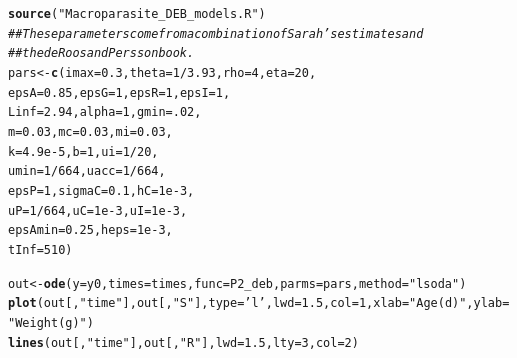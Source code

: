 \documentclass[12pt,reqno,final,pdftex]{amsart}\usepackage[]{graphicx}\usepackage[]{color}
\makeatletter
\newcommand{\hlnum}[1]{\textcolor[rgb]{0.686,0.059,0.569}{#1}}%
\newcommand{\hlstr}[1]{\textcolor[rgb]{0.192,0.494,0.8}{#1}}%
\newcommand{\hlcom}[1]{\textcolor[rgb]{0.678,0.584,0.686}{\textit{#1}}}%
\newcommand{\hlopt}[1]{\textcolor[rgb]{0,0,0}{#1}}%
\newcommand{\hlstd}[1]{\textcolor[rgb]{0.345,0.345,0.345}{#1}}%
\newcommand{\hlkwb}[1]{\textcolor[rgb]{0.69,0.353,0.396}{#1}}%
\newcommand{\hlkwc}[1]{\textcolor[rgb]{0.333,0.667,0.333}{#1}}%
\newcommand{\hlkwd}[1]{\textcolor[rgb]{0.737,0.353,0.396}{\textbf{#1}}}%
\newenvironment{kframe}{%
 \def\at@end@of@kframe{}%
 \ifinner\ifhmode%
  \def\at@end@of@kframe{\end{minipage}}%
  \begin{minipage}{\columnwidth}%
 \fi\fi%
 \def\FrameCommand##1{\hskip\@totalleftmargin \hskip-\fboxsep
 \colorbox{shadecolor}{##1}\hskip-\fboxsep
     \hskip-\linewidth \hskip-\@totalleftmargin \hskip\columnwidth}%
 \MakeFramed {\advance\hsize-\width
   \@totalleftmargin\z@ \linewidth\hsize
   \@setminipage}}%
 {\par\unskip\endMakeFramed%
 \at@end@of@kframe}
\newenvironment{knitrout}{}{} %
\theoremstyle{plain}
\numberwithin{equation}{part}
\makeatother
\begin{document}
\begin{knitrout}
\begin{kframe}
\begin{alltt}
\hlkwd{source}\hlstd{(}\hlstr{"Macroparasite_DEB_models.R"}\hlstd{)}
\hlcom{## These parameters come from a combination of Sarah's estimates and}
\hlcom{## the de Roos and Persson book.}
\hlstd{pars} \hlkwb{<-} \hlkwd{c}\hlstd{(}\hlkwc{imax}\hlstd{=}\hlnum{0.3}\hlstd{,} \hlkwc{theta}\hlstd{=}\hlnum{1}\hlopt{/}\hlnum{3.93}\hlstd{,} \hlkwc{rho}\hlstd{=}\hlnum{4}\hlstd{,} \hlkwc{eta}\hlstd{=}\hlnum{20}\hlstd{,}
          \hlkwc{epsA}\hlstd{=}\hlnum{0.85}\hlstd{,} \hlkwc{epsG}\hlstd{=}\hlnum{1}\hlstd{,} \hlkwc{epsR}\hlstd{=}\hlnum{1}\hlstd{,} \hlkwc{epsI}\hlstd{=}\hlnum{1}\hlstd{,}
          \hlkwc{Linf}\hlstd{=}\hlnum{2.94}\hlstd{,} \hlkwc{alpha}\hlstd{=}\hlnum{1}\hlstd{,} \hlkwc{gmin}\hlstd{=}\hlnum{.02}\hlstd{,}
          \hlkwc{m}\hlstd{=}\hlnum{0.03}\hlstd{,} \hlkwc{mc}\hlstd{=}\hlnum{0.03}\hlstd{,} \hlkwc{mi}\hlstd{=}\hlnum{0.03}\hlstd{,}
          \hlkwc{k}\hlstd{=}\hlnum{4.9e-5}\hlstd{,} \hlkwc{b}\hlstd{=}\hlnum{1}\hlstd{,} \hlkwc{ui}\hlstd{=}\hlnum{1}\hlopt{/}\hlnum{20}\hlstd{,}
          \hlkwc{umin}\hlstd{=}\hlnum{1}\hlopt{/}\hlnum{664}\hlstd{,} \hlkwc{uacc}\hlstd{=}\hlnum{1}\hlopt{/}\hlnum{664}\hlstd{,}
          \hlkwc{epsP}\hlstd{=}\hlnum{1}\hlstd{,} \hlkwc{sigmaC}\hlstd{=}\hlnum{0.1}\hlstd{,} \hlkwc{hC}\hlstd{=}\hlnum{1e-3}\hlstd{,}
          \hlkwc{uP}\hlstd{=}\hlnum{1}\hlopt{/}\hlnum{664}\hlstd{,} \hlkwc{uC}\hlstd{=}\hlnum{1e-3}\hlstd{,} \hlkwc{uI}\hlstd{=}\hlnum{1e-3}\hlstd{,}
          \hlkwc{epsAmin}\hlstd{=}\hlnum{0.25}\hlstd{,} \hlkwc{heps}\hlstd{=}\hlnum{1e-3}\hlstd{,}
          \hlkwc{tInf}\hlstd{=}\hlnum{510}\hlstd{)}

\hlstd{out} \hlkwb{<-} \hlkwd{ode}\hlstd{(}\hlkwc{y}\hlstd{=y0,} \hlkwc{times}\hlstd{=times,} \hlkwc{func}\hlstd{=P2_deb,} \hlkwc{parms}\hlstd{=pars,} \hlkwc{method}\hlstd{=}\hlstr{"lsoda"}\hlstd{)}
\hlkwd{plot}\hlstd{(out[,}\hlstr{"time"}\hlstd{], out[,}\hlstr{"S"}\hlstd{],} \hlkwc{type}\hlstd{=}\hlstr{'l'}\hlstd{,} \hlkwc{lwd}\hlstd{=}\hlnum{1.5}\hlstd{,} \hlkwc{col}\hlstd{=}\hlnum{1}\hlstd{,} \hlkwc{xlab}\hlstd{=}\hlstr{"Age (d)"}\hlstd{,} \hlkwc{ylab}\hlstd{=}\hlstr{"Weight (g)"}\hlstd{)}
\hlkwd{lines}\hlstd{(out[,}\hlstr{"time"}\hlstd{], out[,}\hlstr{"R"}\hlstd{],} \hlkwc{lwd}\hlstd{=}\hlnum{1.5}\hlstd{,} \hlkwc{lty}\hlstd{=}\hlnum{3}\hlstd{,} \hlkwc{col}\hlstd{=}\hlnum{2}\hlstd{)}
\end{alltt}
\end{kframe}\begin{figure}


\end{figure}
\end{knitrout}
\end{document}
